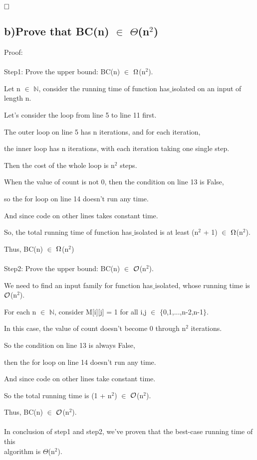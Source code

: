 \documentclass[12pt]{article}
\begin{document}
$\hfill\square$ 
\newpage



\subsection*{b)Prove that BC(n) $\in$ $\Theta$(n$^{2}$)}
\vspace{20pt}
Proof:\\
\\
Step1: Prove the upper bound:  BC(n) $\in$ $\ohm$(n$^{2}$).

Let n $\in$ $\mathbb{N}$, consider the running time of function has$\_$isolated on an input of length n.

Let's consider the loop from line 5 to line 11 first.

The outer loop on line 5 has n iterations, and for each iteration, 

the inner loop has n iterations, with each iteration taking one single step. 

Then the cost of the whole loop is n$^{2}$ steps.

When the value of count is not 0, then the condition on line 13 is False, 

so the for loop on line 14 doesn't run any time.

And since code on other lines takes constant time.

So, the total running time of function has$\_$isolated is at least (n$^{2}$ + 1) $\in$ $\ohm$(n$^{2}$).

Thus, BC(n) $\in$ $\ohm$(n$^{2}$)\\
\\
Step2: Prove the upper bound:  BC(n) $\in$ $\mathcal O$(n$^{2}$).

We need to find an input family for function has$\_$isolated, whose running time is $\mathcal O$(n$^{2}$).

For each n $\in$ $\mathbb{N}$, consider M[i][j] = 1 for all i,j $\in$ $\{$0,1,...,n-2,n-1$\}$.

In this case, the value of count doesn't become 0 through n$^{2}$ iterations.

So the condition on line 13 is always False, 

then the for loop on line 14 doesn't run any time.

And since code on other lines take constant time.

So the total running time is (1 + n$^{2}$) $\in$ $\mathcal O$(n$^{2}$).

Thus, BC(n) $\in$ $\mathcal O$(n$^{2}$).\\
\\
In conclusion of step1 and step2, we've proven that the best-case running time of this \\
algorithm is $\Theta$(n$^{2}$).\\
\end{document}
